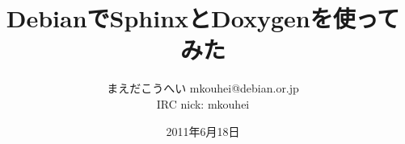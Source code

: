 




\documentclass[cjk,dvipdfmx,12pt]{beamer}
\usepackage{monthlypresentation}



\title{DebianでSphinxとDoxygenを使ってみた}
\author{まえだこうへい mkouhei@debian.or.jp\\IRC nick: mkouhei}
\date{2011年6月18日}



